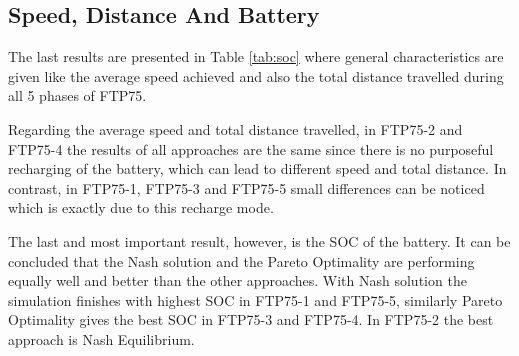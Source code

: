 \subsection{Speed, Distance And Battery}
The last results are presented in Table \ref{tab:soc} where general characteristics are given like the average speed achieved and also the total distance travelled during all 5 phases of FTP75. 

Regarding the average speed and total distance travelled, in FTP75-2 and FTP75-4 the results of all approaches are the same since there is no purposeful recharging of the battery, which can lead to different speed and total distance. In contrast, in FTP75-1, FTP75-3 and FTP75-5 small differences can be noticed which is exactly due to this recharge mode.

The last and most important result, however, is the SOC of the battery. It can be concluded that the Nash solution and the Pareto Optimality are performing equally well and better than the other approaches. With Nash solution the simulation finishes with highest SOC in FTP75-1 and FTP75-5, similarly Pareto Optimality gives the best SOC in FTP75-3 and FTP75-4. In FTP75-2 the best approach is Nash Equilibrium. 


